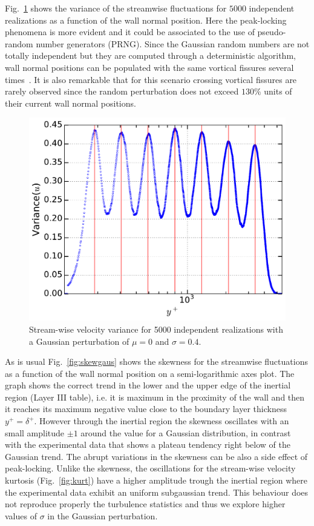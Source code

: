 \documentclass[aps,reprint,amsmath,amssymb,pra,floatfix]{revtex4-1}%
\begin{document}
Fig.~\ref{fig:varigaus} shows the variance of the streamwise fluctuations for $5000$ independent realizations as a function of the wall normal position. Here the peak-locking phenomena is more evident and it could be associated to the use of pseudo-random number generators (PRNG). Since the Gaussian random numbers are not totally independent but they are computed through a deterministic algorithm, wall normal positions can be populated with the same vortical fissures several times~\cite{nm}. It is also remarkable that for this scenario crossing vortical fissures are rarely observed since the random perturbation does not exceed $130\%$ units of their current wall normal positions. 

\begin{figure}[tb]
\includegraphics[scale=0.46]{figures/variance_5000_assembles}
\caption{\label{fig:varigaus} Stream-wise velocity variance for 5000 independent realizations with a Gaussian perturbation of $\mu=0$ and $\sigma=0.4$.}
\end{figure}
As is usual Fig.~\ref{fig:skewgaus} shows the skewness for the streamwise fluctuations as a function of the wall normal position on a semi-logarithmic axes plot. The graph shows the correct trend in the lower and the upper edge of the inertial region (Layer III table), i.e. it is maximum in the proximity of the wall and then it reaches its maximum negative value close to the boundary layer thickness $y^+=\delta^+$. However through the inertial region the skewness oscillates with an small amplitude $\pm 1$ around the value for a Gaussian distribution, in contrast with the experimental data that shows a plateau tendency right below of the Gaussian trend. The abrupt variations in the skewness can be also a side effect of peak-locking. Unlike the skewness, the oscillations for the stream-wise velocity kurtosis (Fig.~\ref{fig:kurt}) have a higher amplitude trough the inertial region where the experimental data exhibit an uniform subgaussian trend. This behaviour does not reproduce properly the turbulence statistics and thus we explore higher values of $\sigma$ in the Gaussian perturbation.
\end{document}
